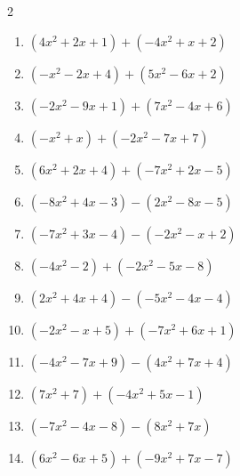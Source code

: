 \begin{multicols}{2}
\begin{enumerate}

  \item $(4x^{2}+2x+1)+(-4x^{2}+x+2)$

        \phantom{$=3x+3$}

  \item $(-x^{2}-2x+4)+(5x^{2}-6x+2)$


  \item $(-2x^{2}-9x+1)+(7x^{2}-4x+6)$


  \item $(-x^{2}+x)+(-2x^{2}-7x+7)$


  \item $(6x^{2}+2x+4)+(-7x^{2}+2x-5)$


  \item $(-8x^{2}+4x-3)-(2x^{2}-8x-5)$


  \item $(-7x^{2}+3x-4)-(-2x^{2}-x+2)$


  \item $(-4x^{2}-2)+(-2x^{2}-5x-8)$


  \item $(2x^{2}+4x+4)-(-5x^{2}-4x-4)$


  \item $(-2x^{2}-x+5)+(-7x^{2}+6x+1)$


  \item $(-4x^{2}-7x+9)-(4x^{2}+7x+4)$


  \item $(7x^{2}+7)+(-4x^{2}+5x-1)$


  \item $(-7x^{2}-4x-8)-(8x^{2}+7x)$


  \item $(6x^{2}-6x+5)+(-9x^{2}+7x-7)$


\end{enumerate}
\end{multicols}
